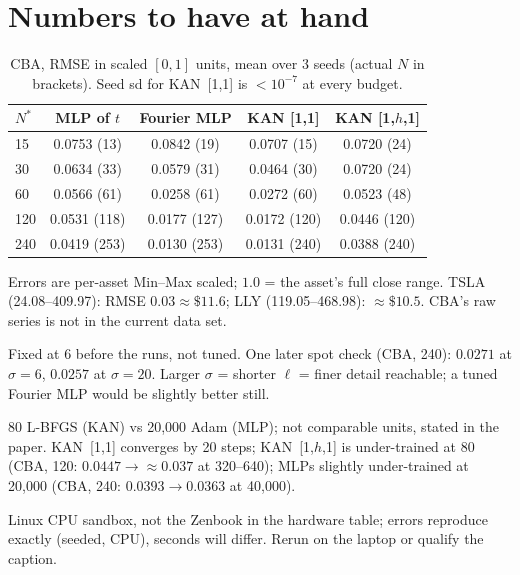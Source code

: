 \documentclass[11pt,a4paper]{article}
\begin{document}
\section{Numbers to have at hand}
\begin{table}[H]\centering\small
\caption{CBA, RMSE in scaled $[0,1]$ units, mean over 3 seeds (actual $N$ in brackets). Seed sd for KAN~[1,1] is $<10^{-7}$ at every budget.}
\begin{tabular}{lcccc}
\toprule
$N^*$ & MLP of $t$ & Fourier MLP & KAN [1,1] & KAN [1,$h$,1]\\
\midrule
15  & 0.0753 (13) & 0.0842 (19) & 0.0707 (15) & 0.0720 (24)\\
30  & 0.0634 (33) & 0.0579 (31) & 0.0464 (30) & 0.0720 (24)\\
60  & 0.0566 (61) & 0.0258 (61) & 0.0272 (60) & 0.0523 (48)\\
120 & 0.0531 (118) & 0.0177 (127) & 0.0172 (120) & 0.0446 (120)\\
240 & 0.0419 (253) & 0.0130 (253) & 0.0131 (240) & 0.0388 (240)\\
\bottomrule
\end{tabular}
\end{table}
\begin{description}[leftmargin=0pt,itemsep=2pt]
\item[Dollar scale.] Errors are per-asset Min--Max scaled; $1.0$ = the asset's full close range. TSLA (24.08--409.97): RMSE $0.03\approx\$11.6$; LLY (119.05--468.98): $\approx\$10.5$. CBA's raw series is not in the current data set.
\item[$\sigma$.] Fixed at 6 before the runs, not tuned. One later spot check (CBA, 240): $0.0271$ at $\sigma=6$, $0.0257$ at $\sigma=20$. Larger $\sigma$ = shorter $\ell$ = finer detail reachable; a tuned Fourier MLP would be slightly better still.
\item[Steps.] 80 L-BFGS (KAN) vs 20{,}000 Adam (MLP); not comparable units, stated in the paper. KAN~[1,1] converges by 20 steps; KAN~[1,$h$,1] is under-trained at 80 (CBA, 120: $0.0447\to\approx0.037$ at 320--640); MLPs slightly under-trained at 20{,}000 (CBA, 240: $0.0393\to0.0363$ at 40{,}000).
\item[Where run.] Linux CPU sandbox, not the Zenbook in the hardware table; errors reproduce exactly (seeded, CPU), seconds will differ. Rerun on the laptop or qualify the caption.
\end{description}
\end{document}
